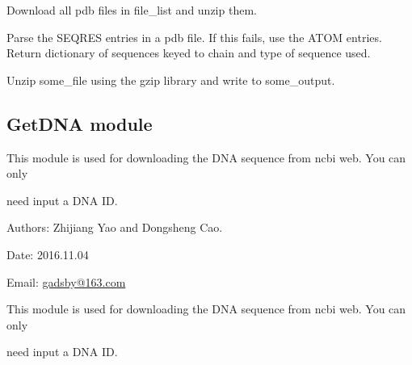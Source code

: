 \documentclass[letterpaper,10pt,english]{sphinxmanual}
\begin{document}

\begin{fulllineitems}
\label{reference/GetProtein:GetProtein.pdbDownload}
Download all pdb files in file\_list and unzip them.

\end{fulllineitems}


\begin{fulllineitems}
\label{reference/GetProtein:GetProtein.pdbSeq}
Parse the SEQRES entries in a pdb file.  If this fails, use the ATOM
entries.  Return dictionary of sequences keyed to chain and type of
sequence used.

\end{fulllineitems}


\begin{fulllineitems}
\label{reference/GetProtein:GetProtein.unZip}
Unzip some\_file using the gzip library and write to some\_output.

\end{fulllineitems}



\subsection{GetDNA module}
\label{reference/GetDNA:getdna-module}\label{reference/GetDNA::doc}\label{reference/GetDNA:module-GetDNA}
This module is used for downloading the DNA sequence from ncbi web. You can only

need input a DNA ID.

Authors: Zhijiang Yao and Dongsheng Cao.

Date: 2016.11.04

Email: \href{mailto:gadsby@163.com}{gadsby@163.com}

\begin{fulllineitems}
\label{reference/GetDNA:GetDNA.GetDNAFromUniGene}
This module is used for downloading the DNA sequence from ncbi web. You can only

need input a DNA ID.

\end{fulllineitems}
\end{document}
